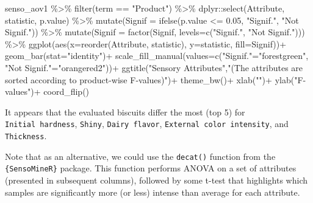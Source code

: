 \documentclass[
]{book}
\newenvironment{Shaded}{\begin{snugshade}}{\end{snugshade}}
\newcommand{\AttributeTok}[1]{\textcolor[rgb]{0.77,0.63,0.00}{#1}}
\newcommand{\FloatTok}[1]{\textcolor[rgb]{0.00,0.00,0.81}{#1}}
\newcommand{\FunctionTok}[1]{\textcolor[rgb]{0.00,0.00,0.00}{#1}}
\newcommand{\NormalTok}[1]{#1}
\newcommand{\OtherTok}[1]{\textcolor[rgb]{0.56,0.35,0.01}{#1}}
\newcommand{\SpecialCharTok}[1]{\textcolor[rgb]{0.00,0.00,0.00}{#1}}
\newcommand{\StringTok}[1]{\textcolor[rgb]{0.31,0.60,0.02}{#1}}
\begin{document}
\begin{Shaded}
\begin{Highlighting}[]
\NormalTok{senso\_aov1 }\SpecialCharTok{\%\textgreater{}\%} 
  \FunctionTok{filter}\NormalTok{(term }\SpecialCharTok{==} \StringTok{"Product"}\NormalTok{) }\SpecialCharTok{\%\textgreater{}\%} 
\NormalTok{  dplyr}\SpecialCharTok{::}\FunctionTok{select}\NormalTok{(Attribute, statistic, p.value) }\SpecialCharTok{\%\textgreater{}\%} 
  \FunctionTok{mutate}\NormalTok{(}\AttributeTok{Signif =} \FunctionTok{ifelse}\NormalTok{(p.value }\SpecialCharTok{\textless{}=} \FloatTok{0.05}\NormalTok{, }\StringTok{"Signif."}\NormalTok{, }\StringTok{"Not Signif."}\NormalTok{)) }\SpecialCharTok{\%\textgreater{}\%} 
  \FunctionTok{mutate}\NormalTok{(}\AttributeTok{Signif =} \FunctionTok{factor}\NormalTok{(Signif, }\AttributeTok{levels=}\FunctionTok{c}\NormalTok{(}\StringTok{"Signif."}\NormalTok{, }\StringTok{"Not Signif."}\NormalTok{))) }\SpecialCharTok{\%\textgreater{}\%} 
  \FunctionTok{ggplot}\NormalTok{(}\FunctionTok{aes}\NormalTok{(}\AttributeTok{x=}\FunctionTok{reorder}\NormalTok{(Attribute, statistic), }\AttributeTok{y=}\NormalTok{statistic, }\AttributeTok{fill=}\NormalTok{Signif))}\SpecialCharTok{+}
  \FunctionTok{geom\_bar}\NormalTok{(}\AttributeTok{stat=}\StringTok{"identity"}\NormalTok{)}\SpecialCharTok{+}
  \FunctionTok{scale\_fill\_manual}\NormalTok{(}\AttributeTok{values=}\FunctionTok{c}\NormalTok{(}\StringTok{"Signif."}\OtherTok{=}\StringTok{"forestgreen"}\NormalTok{, }\StringTok{"Not Signif."}\OtherTok{=}\StringTok{"orangered2"}\NormalTok{))}\SpecialCharTok{+}
  \FunctionTok{ggtitle}\NormalTok{(}\StringTok{"Sensory Attributes"}\NormalTok{,}\StringTok{"(The attributes are sorted according to product{-}wise F{-}values)"}\NormalTok{)}\SpecialCharTok{+}
  \FunctionTok{theme\_bw}\NormalTok{()}\SpecialCharTok{+}
  \FunctionTok{xlab}\NormalTok{(}\StringTok{""}\NormalTok{)}\SpecialCharTok{+}
  \FunctionTok{ylab}\NormalTok{(}\StringTok{"F{-}values"}\NormalTok{)}\SpecialCharTok{+}
  \FunctionTok{coord\_flip}\NormalTok{()}
\end{Highlighting}
\end{Shaded}

It appears that the evaluated biscuits differ the most (top 5) for \texttt{Initial\ hardness}, \texttt{Shiny}, \texttt{Dairy\ flavor}, \texttt{External\ color\ intensity}, and \texttt{Thickness}.

Note that as an alternative, we could use the \texttt{decat()} function from the \texttt{\{SensoMineR\}} package. This function performs ANOVA on a set of attributes (presented in subsequent columns), followed by some t-test that highlights which samples are significantly more (or less) intense than average for each attribute.
\end{document}
